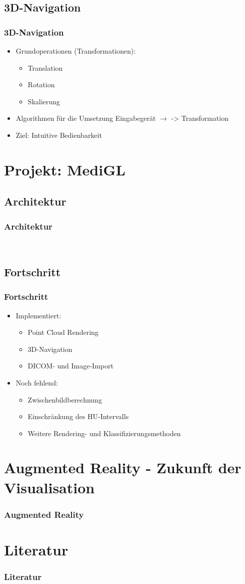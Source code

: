 \documentclass[14pt]{beamer}
\begin{document}
\subsection{3D-Navigation}
\begin{frame}
 \frametitle{3D-Navigation}
 \begin{itemize}
  \item Grundoperationen (Transformationen):
  \begin{itemize}
   \item Translation
   \item Rotation
   \item Skalierung
  \end{itemize}
  \item Algorithmen für die Umsetzung Eingabegerät $\rightarrow$ -> Transformation
  \item Ziel: Intuitive Bedienbarkeit
 \end{itemize}
\end{frame}
%
%
%
\section{Projekt: MediGL}
%
\subsection{Architektur}
\begin{frame}[allowframebreaks]
\frametitle{Architektur}
\\
\end{frame}
%
\subsection{Fortschritt}
\begin{frame}
\frametitle{Fortschritt}
\begin{itemize}
 \item Implementiert:
  \begin{itemize}
   \item Point Cloud Rendering
   \item 3D-Navigation
   \item DICOM- und Image-Import
  \end{itemize}
  \item Noch fehlend:
  \begin{itemize}
   \item Zwischenbildberechnung
   \item Einschränkung des HU-Intervalls
   \item Weitere Rendering- und Klassifizierungsmethoden
  \end{itemize}
\end{itemize}

\end{frame}
%
%
%
\section{Augmented Reality - Zukunft der Visualisation}
\begin{frame}
\frametitle{Augmented Reality}
\end{frame}
%
%
%
\section{Literatur}
\begin{frame}
\frametitle{Literatur}
\cite{Azuma1997}
\end{frame}
\end{document}
